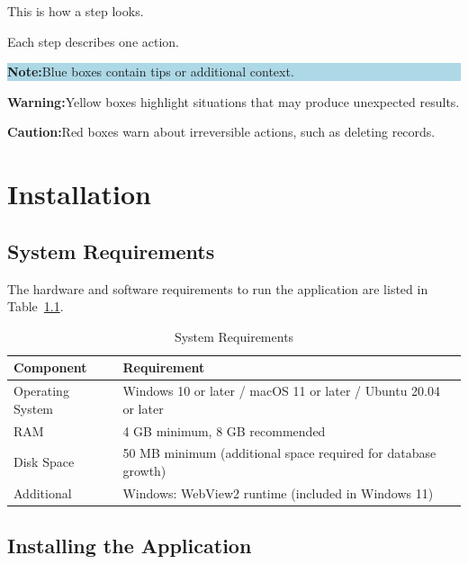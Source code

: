 \documentclass[12pt, a4paper]{report}
\newcommand{\notebox}[1]{%
	\vspace{6pt}
	\noindent
	\colorbox{LightBlue}{%
		\begin{minipage}{\dimexpr\linewidth-2\fboxsep}%
			\vspace{5pt}
			\small\textbf{\color{Blue}Note:\space}\color{Navy}#1
			\vspace{5pt}
		\end{minipage}%
	}
	\vspace{6pt}
}
\newcommand{\warnbox}[1]{%
	\vspace{6pt}
	\noindent
	\colorbox{WarnYellow}{%
		\begin{minipage}{\dimexpr\linewidth-2\fboxsep}%
			\vspace{5pt}
			\small\textbf{\color{WarnBorder}Warning:\space}\color{Navy}#1
			\vspace{5pt}
		\end{minipage}%
	}
	\vspace{6pt}
}
\newcommand{\dangerbox}[1]{%
	\vspace{6pt}
	\noindent
	\colorbox{DangerRed}{%
		\begin{minipage}{\dimexpr\linewidth-2\fboxsep}%
			\vspace{5pt}
			\small\textbf{\color{DangerBorder}Caution:\space}\color{Navy}#1
			\vspace{5pt}
		\end{minipage}%
	}
	\vspace{6pt}
}
\begin{document}
	\begin{steps}
		\item This is how a step looks.
		\item Each step describes one action.
	\end{steps}
	
	\notebox{Blue boxes contain tips or additional context.}
	
	\warnbox{Yellow boxes highlight situations that may produce unexpected results.}
	
	\dangerbox{Red boxes warn about irreversible actions, such as deleting records.}
	
	\chapter{Installation}
	
	\section{System Requirements}
	
	The hardware and software requirements to run the application are listed in Table~\ref{tab:system_requirements}.
	
	\begin{table}[H]
		\centering
		\caption{System Requirements}
		\label{tab:system_requirements}
		\begin{tabularx}{\textwidth}{l X}
			\toprule
			\textbf{Component} & \textbf{Requirement} \\
			\midrule
			Operating System & Windows 10 or later / macOS 11 or later / Ubuntu 20.04 or later \\
			RAM              & 4 GB minimum, 8 GB recommended \\
			Disk Space       & 50 MB minimum (additional space required for database growth) \\
			Additional       & Windows: WebView2 runtime (included in Windows 11) \\
			\bottomrule
		\end{tabularx}
	\end{table}
	
	\section{Installing the Application}
	
\end{document}
